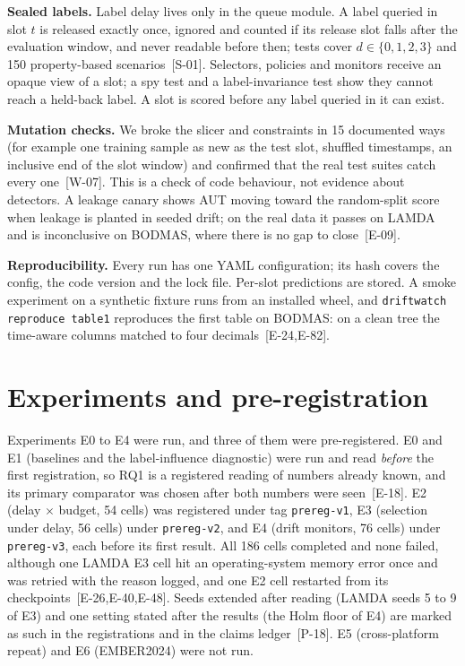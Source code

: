 \documentclass[conference,a4paper]{IEEEtran}
\newcommand{\clm}[1]{{\scriptsize[#1]}}
\begin{document}
\textbf{Sealed labels.} Label delay lives only in the queue module. A label queried in slot $t$ is released exactly once, ignored and counted if its release slot falls after the evaluation window, and never readable before then; tests cover $d\in\{0,1,2,3\}$ and 150 property-based scenarios~\clm{S-01}. Selectors, policies and monitors receive an opaque view of a slot; a spy test and a label-invariance test show they cannot reach a held-back label. A slot is scored before any label queried in it can exist.

\textbf{Mutation checks.} We broke the slicer and constraints in 15 documented ways (for example one training sample as new as the test slot, shuffled timestamps, an inclusive end of the slot window) and confirmed that the real test suites catch every one~\clm{W-07}. This is a check of code behaviour, not evidence about detectors. A leakage canary shows AUT moving toward the random-split score when leakage is planted in seeded drift; on the real data it passes on LAMDA and is inconclusive on BODMAS, where there is no gap to close~\clm{E-09}.

\textbf{Reproducibility.} Every run has one YAML configuration; its hash covers the config, the code version and the lock file. Per-slot predictions are stored. A smoke experiment on a synthetic fixture runs from an installed wheel, and \texttt{driftwatch reproduce table1} reproduces the first table on BODMAS: on a clean tree the time-aware columns matched to four decimals~\clm{E-24,E-82}.

\section{Experiments and pre-registration}
Experiments E0 to E4 were run, and three of them were pre-registered. E0 and E1 (baselines and the label-influence diagnostic) were run and read \emph{before} the first registration, so RQ1 is a registered reading of numbers already known, and its primary comparator was chosen after both numbers were seen~\clm{E-18}. E2 (delay $\times$ budget, 54 cells) was registered under tag \texttt{prereg-v1}, E3 (selection under delay, 56 cells) under \texttt{prereg-v2}, and E4 (drift monitors, 76 cells) under \texttt{prereg-v3}, each before its first result. All 186 cells completed and none failed, although one LAMDA E3 cell hit an operating-system memory error once and was retried with the reason logged, and one E2 cell restarted from its checkpoints~\clm{E-26,E-40,E-48}. Seeds extended after reading (LAMDA seeds 5 to 9 of E3) and one setting stated after the results (the Holm floor of E4) are marked as such in the registrations and in the claims ledger~\clm{P-18}. E5 (cross-platform repeat) and E6 (EMBER2024) were not run.
\end{document}
